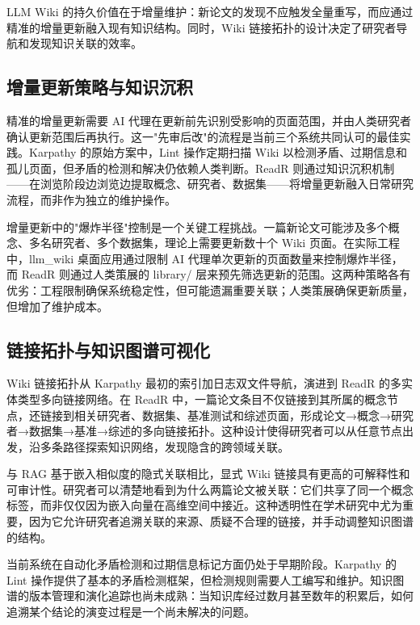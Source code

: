 \documentclass[11pt, a4paper, nonumbering]{SciMasterNoBrand}
\begin{document}
LLM Wiki 的持久价值在于增量维护：新论文的发现不应触发全量重写，而应通过精准的增量更新融入现有知识结构。同时，Wiki 链接拓扑的设计决定了研究者导航和发现知识关联的效率。

\subsection{增量更新策略与知识沉积}

精准的增量更新需要 AI 代理在更新前先识别受影响的页面范围，并由人类研究者确认更新范围后再执行\cite{karpathy2026llmwiki}。这一"先审后改"的流程是当前三个系统共同认可的最佳实践。Karpathy 的原始方案中，Lint 操作定期扫描 Wiki 以检测矛盾、过期信息和孤儿页面，但矛盾的检测和解决仍依赖人类判断\cite{karpathy2026llmwiki}。ReadR 则通过知识沉积机制——在浏览阶段边浏览边提取概念、研究者、数据集——将增量更新融入日常研究流程，而非作为独立的维护操作\cite{woo2026readr}。

增量更新中的"爆炸半径"控制是一个关键工程挑战。一篇新论文可能涉及多个概念、多名研究者、多个数据集，理论上需要更新数十个 Wiki 页面。在实际工程中，llm\_wiki 桌面应用通过限制 AI 代理单次更新的页面数量来控制爆炸半径\cite{su2026llmwiki}，而 ReadR 则通过人类策展的 library/ 层来预先筛选更新的范围\cite{woo2026readr}。这两种策略各有优劣：工程限制确保系统稳定性，但可能遗漏重要关联；人类策展确保更新质量，但增加了维护成本。

\subsection{链接拓扑与知识图谱可视化}

Wiki 链接拓扑从 Karpathy 最初的索引加日志双文件导航，演进到 ReadR 的多实体类型多向链接网络\cite{woo2026readr}。在 ReadR 中，一篇论文条目不仅链接到其所属的概念节点，还链接到相关研究者、数据集、基准测试和综述页面，形成论文→概念→研究者→数据集→基准→综述的多向链接拓扑。这种设计使得研究者可以从任意节点出发，沿多条路径探索知识网络，发现隐含的跨领域关联。

与 RAG 基于嵌入相似度的隐式关联相比，显式 Wiki 链接具有更高的可解释性和可审计性\cite{gytėtamašauskaitė2023}。研究者可以清楚地看到为什么两篇论文被关联：它们共享了同一个概念标签，而非仅仅因为嵌入向量在高维空间中接近。这种透明性在学术研究中尤为重要，因为它允许研究者追溯关联的来源、质疑不合理的链接，并手动调整知识图谱的结构\cite{bartmeyers2024}。

当前系统在自动化矛盾检测和过期信息标记方面仍处于早期阶段。Karpathy 的 Lint 操作提供了基本的矛盾检测框架，但检测规则需要人工编写和维护\cite{karpathy2026llmwiki}。知识图谱的版本管理和演化追踪也尚未成熟：当知识库经过数月甚至数年的积累后，如何追溯某个结论的演变过程是一个尚未解决的问题\cite{kathrinblagec2022}。
\end{document}
